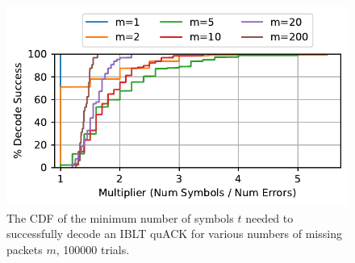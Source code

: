 \begin{figure}[t]
    \centering
    \includegraphics[width=0.7\linewidth]{quack/figures/quack_multiplier.pdf}
    \caption{The CDF of the minimum number of symbols $t$ needed to successfully
     decode an IBLT quACK for various numbers of missing packets $m$, 100000
     trials.}
    \label{fig:quack:iblt-correctness}
\end{figure}